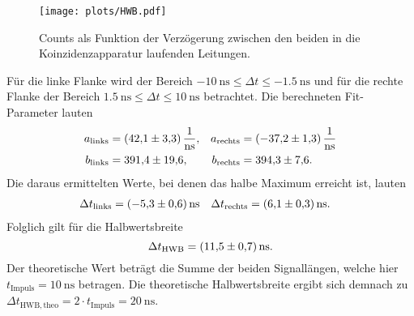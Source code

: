 \begin{figure}[H]
  \centering
  \texttt{[image: plots/HWB.pdf]}
  \caption{Counts als Funktion der Verzögerung zwischen den beiden in die Koinzidenzapparatur laufenden Leitungen.}
  \label{fig:verz}
\end{figure}

Für die linke Flanke wird der Bereich $\SI{-10}{\nano\second} \leq \Delta t \leq \SI{-1.5}{\ns}$ und für die rechte Flanke der Bereich $\SI{1.5}{\ns} \leq \Delta t \leq \SI{10}{\ns}$ betrachtet. Die berechneten Fit-Parameter lauten
\begin{align*}
  a_\mathrm{links} &= \SI{42.1 \pm 3.3}{\per\ns}, & a_\mathrm{rechts} &= \SI{-37.2 \pm 1.3}{\per\ns} \\
  b_\mathrm{links} &= \num{391.4 \pm 19.6}, & b_\mathrm{rechts} &= \num{394.3 \pm 7.6}.
\end{align*}
Die daraus ermittelten Werte, bei denen das halbe Maximum erreicht ist, lauten
\begin{align*}
  \Delta t_\mathrm{links} &= \SI{-5.3 \pm 0.6}{\ns} & \Delta t_\mathrm{rechts} &= \SI{6.1 \pm 0.3}{\ns}.
\end{align*}
Folglich gilt für die Halbwertsbreite
\begin{equation*}
  \Delta t_\mathrm{HWB} = \SI{11.5 \pm 0.7}{\ns}.
\end{equation*}
Der theoretische Wert beträgt die Summe der beiden Signallängen, welche hier $t_\mathrm{Impuls} = \SI{10}{\nano\second}$ betragen. Die theoretische Halbwertsbreite ergibt sich demnach zu $\Delta t_\mathrm{HWB, theo} = 2 \cdot t_\mathrm{Impuls} = \SI{20}{\nano\second}$.

